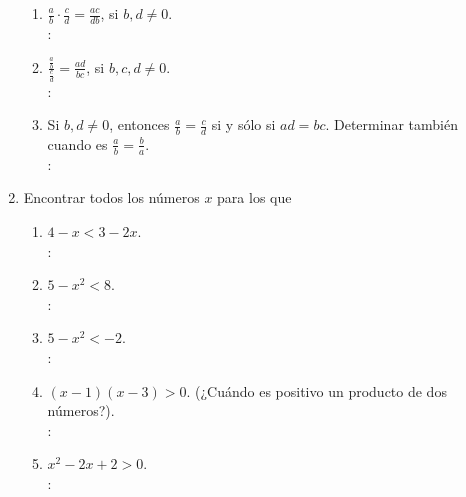 \begin{enumerate}
\begin{enumerate}[label=\roman*.]
        \item $ \displaystyle \frac{a}{b} \cdot \frac{c}{d} = \frac{ac}{db} $, si $b,d \neq 0$. \\
        \solucion: \\
        
        \item $ \displaystyle \frac{\frac{a}{b}}{\frac{c}{d}} = \frac{ad}{bc} $, si $b, c, d \neq 0$. \\
        \solucion: \\
        
        \item Si $b,d \neq 0$, entonces $ \displaystyle \frac{a}{b} = \frac{c}{d}$ si y sólo si $ ad = bc $. Determinar también cuando es $ \displaystyle \frac{a}{b} = \frac{b}{a} $. \\
        \solucion: \\
        
    \end{enumerate}
    
    \item Encontrar todos los números $x$ para los que
    \begin{enumerate}[label=\roman*.]
        \item $ 4-x < 3 - 2x $. \\
        \solucion: \\
        
        \item $ 5 - x^2 < 8 $. \\
        \solucion: \\
        
        \item $ 5 - x^2 < -2 $. \\
        \solucion: \\
        
        \item $ (x-1)(x-3) > 0  $. (¿Cuándo es positivo un producto de dos números?). \\
        \solucion: \\
        
        \item $ x^2 - 2x + 2 > 0 $. \\
        \solucion: \\
        

\end{enumerate}
\end{enumerate}
